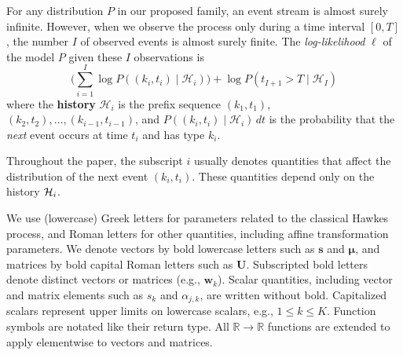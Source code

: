 \documentclass{article}
\renewcommand{\vec}[1]{{\boldsymbol{\mathbf{#1}}}}   %
\newcommand{\defn}[1]{\textbf{#1}}   %
\newcommand{\Real}{\mathbb{R}}
\newcommand{\note}[4][]{\todo[author=#2,color=#3,size=\scriptsize,fancyline,caption={},#1]{#4}} %
\newcommand{\jason}[2][]{\note[#1]{jason}{green!40}{#2}}
\newcommand{\hongyuan}[2][]{\note[#1]{hongyuan}{orange!40}{#2}}
\begin{document}
For any distribution $P$ in our proposed family, an event stream is almost surely infinite.  However, when we observe the process only during a time interval $[0,T]$, the number $I$ of observed events is almost surely finite.  The {\em log-likelihood} $\ell$ of the model $P$ given these $I$ observations is
\begin{equation}\label{eqn:loglik-orig}
    \Big( \sum_{i=1}^I \log P\!\left( \left(k_i,t_i\right) \mid \mathcal{H}_{i} \right) \Big) + \log P(t_{I+1} > T \mid \mathcal{H}_I)
\end{equation}
where the \defn{history} $\mathcal{H}_{i}$ is the prefix sequence $(k_1,t_1)$, $(k_2, t_2), \ldots, (k_{i-1}, t_{i-1})$, and
$P((k_i, t_i) \mid \mathcal{H}_i )\,dt$ is the probability that the {\em next} event occurs at time $t_i$ and has type $k_i$.

Throughout the paper, the subscript $i$ usually denotes quantities that affect the distribution of the next event $(k_i,t_i)$. These quantities depend only on the history ${\cal H}_i$.

We use (lowercase) Greek letters for parameters related to the classical Hawkes process,
and Roman letters for other quantities, including affine transformation parameters.
We denote vectors by bold lowercase letters such as $\vec{s}$ and $\vec{\mu}$, and matrices by bold capital Roman letters such as $\vec{U}$. Subscripted bold letters denote distinct vectors or matrices (e.g., $\vec{w}_k$).
Scalar quantities, including vector and matrix elements such as $s_k$ and $\alpha_{j,k}$, are written without bold. Capitalized scalars represent upper limits on lowercase scalars, e.g., $1 \leq k \leq K$.  Function symbols are notated like their return type.
All $\Real \rightarrow \Real$ functions are extended to apply elementwise to vectors and matrices.
\end{document}

